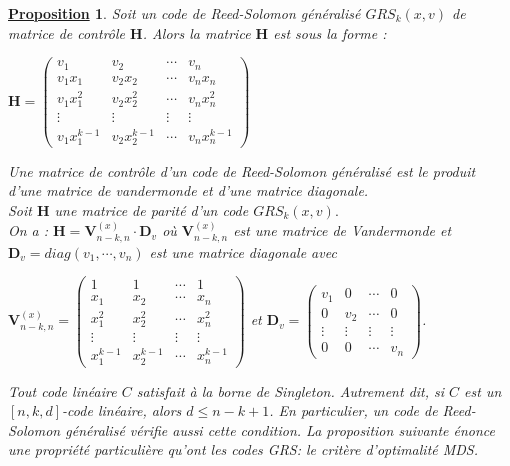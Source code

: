 \documentclass[12pt,openany]{report}
\newtheorem{proposition}{\underline{Proposition}}
\begin{document}
\begin{proposition}
Soit un code de Reed-Solomon généralisé $GRS_k(x,v) $ de matrice de contrôle $ \mathbf{H}$.\hspace{0.2cm} Alors la matrice $\mathbf{H}$ est sous la forme :\\
\begin{center}
$
\mathbf{H}=
\begin{pmatrix} 
         
         v_1 & v_2 & \cdots & v_n \\
         v_1 x_1 & v_2 x_2 & \cdots & v_n x_n \\
         
         v_1 x_1^2 & v_2 x_2^2 & \cdots & v_n x_n^2 \\
      \vdots & \vdots & \vdots &   \vdots \\
      v_1 x_1^{k-1} & v_2 x_2^{k-1} & \cdots & v_n x_n^{k-1}
         
   \end{pmatrix}$

\end{center}

Une matrice de contrôle d'un code de Reed-Solomon généralisé est le produit d'une matrice de vandermonde et d'une matrice diagonale.\\
Soit $\mathbf{H} $ une matrice de parité d'un code $ GRS_k(x,v).$\\
On a : $\mathbf{H} = \mathbf{V}_{n-k,n}^{(x)}\cdot \mathbf{D}_v$ où $\mathbf{V}_{n-k,n}^{(x)}$ est une matrice de Vandermonde et $\mathbf{D}_v=diag(v_1,\cdots,v_n)$ est une matrice diagonale avec
\begin{center}
\scalebox{1}

$\mathbf{V}_{n-k,n}^{(x)}=\left (\begin{smallmatrix}
 1 & 1 & \cdots & 1 \\ x_1 &  x_2 & \cdots & x_n \\ x_1^2 &  x_2^2 & \cdots &  x_n^2 \\\vdots & \vdots & \vdots &   \vdots \\x_1^{k-1} & x_2^{k-1} & \cdots &  x_n^{k-1}
\end{smallmatrix}\right)$ \hspace{0.3cm} et \hspace{0.3cm}
\scalebox{1}
{$\mathbf{D}_v =\begin{pmatrix}  
 v_1 & 0 & \cdots & 0 \\0 &  v_2 & \cdots & 0 \\ \vdots & \vdots & \vdots &   \vdots \\ 0& 0 & \cdots &  v_n \end{pmatrix}$}.

\end{center}
   
    
    Tout code linéaire $\mathit{C}$ satisfait à la borne de Singleton. Autrement dit, si $\mathit{C}$ est un $[n,k,d]$-code linéaire, alors $ d\leq n-k+1$. En particulier, un code de Reed-Solomon généralisé vérifie aussi cette condition. La proposition suivante énonce une propriété particulière qu'ont les codes GRS: le critère d'optimalité MDS.
\end{proposition}    
    
\end{document}
